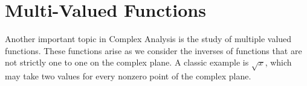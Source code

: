  
\section*{Multi-Valued Functions}

Another important topic in Complex Analysis is the study of multiple valued functions.
These functions arise as we consider the inverses of functions that are not strictly one to one on the complex plane.
A classic example is $\sqrt{x}$, which may take two values for every nonzero point of the complex plane.

